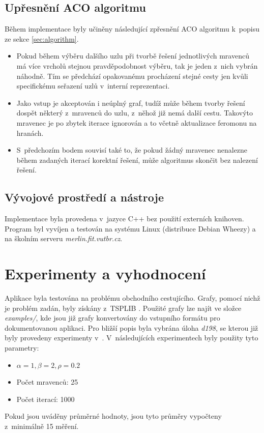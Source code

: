\documentclass[a4paper, 12pt]{article}
\begin{document}
\subsection{Upřesnění ACO algoritmu}
Během implementace byly učiněny následující zpřesnění ACO algoritmu k~popisu ze sekce \ref{sec:algorithm}.
\begin{itemize}
  \item Pokud během výběru dalšího uzlu při tvorbě řešení jednotlivých mravenců má více vrcholů stejnou pravděpodobnost výběru, tak je jeden z~nich vybrán náhodně.
  Tím se předchází opakovanému procházení stejné cesty jen kvůli specifickému seřazení uzlů v~interní reprezentaci.
  \item Jako vstup je akceptován i neúplný graf, tudíž může během tvorby řešení dospět některý z~mravenců do uzlu, z~něhož již nemá další cestu. Takovýto mravenec
  je po zbytek iterace ignorován a to včetně aktualizace feromonu na hranách.
  \item S~předchozím bodem souvisí také to, že pokud žádný mravenec nenalezne během zadaných iterací korektní řešení, může algoritmus skončit bez nalezení
  řešení.
\end{itemize}

\subsection{Vývojové prostředí a nástroje}
Implementace byla provedena v~jazyce C++ bez použití externích knihoven. Program byl vyvíjen a testován na systému Linux (distribuce Debian Wheezy) a na školním
serveru \emph{merlin.fit.vutbr.cz}.

\section{Experimenty a vyhodnocení}
\label{sec:eval}
Aplikace byla testována na problému obchodního cestujícího. Grafy, pomocí nichž je problém zadán, byly získány z~TSPLIB \cite{TSPLIB}.
Použité grafy lze najít ve složce \emph{examples/}, kde jsou již grafy konvertovány do vstupního formátu pro dokumentovanou aplikaci. Pro bližší popis
byla vybrána úloha \emph{d198}, se kterou již byly provedeny experimenty v~\cite{aco:maxmintsp,aco:acs}. V~následujících experimentech byly použity tyto
parametry:
  \begin{itemize}
    \item $\alpha=1, \beta=2, \rho=0.2$
    \item Počet mravenců: 25
    \item Počet iterací: 1000
  \end{itemize}
Pokud jsou uváděny průměrné hodnoty, jsou tyto průměry vypočteny z~minimálně 15 měření.
\end{document}
